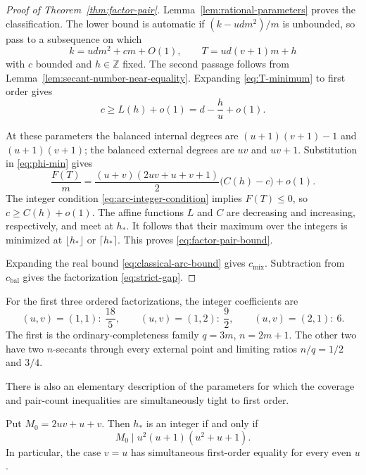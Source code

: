 \begin{proof}[Proof of Theorem~\ref{thm:factor-pair}]
Lemma~\ref{lem:rational-parameters} proves the classification.  The lower
bound is automatic if \((k-udm^2)/m\) is unbounded, so pass to a subsequence
on which
\[
 k=udm^2+cm+O(1),\qquad
 T=ud(v+1)m+h
\]
with \(c\) bounded and \(h\in\mathbb Z\) fixed.  The second passage follows
from Lemma~\ref{lem:secant-number-near-equality}.  Expanding
\eqref{eq:T-minimum} to first order gives
\begin{equation}\label{eq:coverage-linear}
 c\ge L(h)+o(1)=d-\frac hu+o(1).
\end{equation}

At these parameters the balanced internal degrees are
\((u+1)(v+1)-1\) and \((u+1)(v+1)\); the balanced external degrees are
\(uv\) and \(uv+1\).  Substitution in \eqref{eq:phi-min} gives
\begin{equation}\label{eq:pair-linear}
 \frac{F(T)}m
 =\frac{(u+v)(2uv+u+v+1)}2\bigl(C(h)-c\bigr)+o(1).
\end{equation}
The integer condition \eqref{eq:arc-integer-condition} implies \(F(T)\le0\),
so \(c\ge C(h)+o(1)\).  The affine functions \(L\) and \(C\) are decreasing
and increasing, respectively, and meet at \(h_*\).  It follows that their
maximum over the integers is minimized at \(\lfloor h_*\rfloor\) or
\(\lceil h_*\rceil\).  This proves \eqref{eq:factor-pair-bound}.

Expanding the real bound \eqref{eq:classical-arc-bound} gives
\(c_{\mathrm{mix}}\).  Subtraction from \(c_{\mathrm{bal}}\) gives the
factorization \eqref{eq:strict-gap}.
\end{proof}

For the first three ordered factorizations, the integer coefficients are
\begin{equation}\label{eq:first-integer-coefficients}
 (u,v)=(1,1):\ \frac{18}{5},\qquad
 (u,v)=(1,2):\ \frac92,\qquad
 (u,v)=(2,1):\ 6.
\end{equation}
The first is the ordinary-completeness family
\(q=3m\), \(n=2m+1\).  The other two have two \(n\)-secants through every
external point and limiting ratios \(n/q=1/2\) and \(3/4\).

There is also an elementary description of the parameters for which the
coverage and pair-count inequalities are simultaneously tight to first order.

\begin{proposition}
\label{prop:simultaneous-equality}
Put \(M_0=2uv+u+v\).  Then \(h_*\) is an integer if and only if
\begin{equation}\label{eq:simultaneous-equality-divisibility}
 M_0\mid u^2(u+1)(u^2+u+1).
\end{equation}
In particular, the case \(v=u\) has simultaneous first-order equality for
every even \(u\).
\end{proposition}

